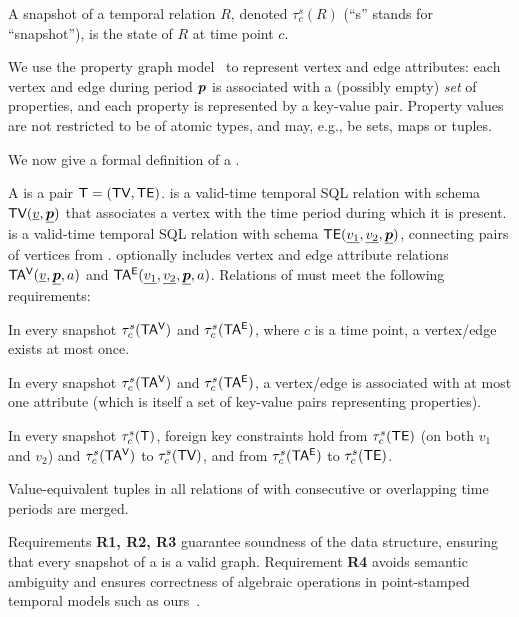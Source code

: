 A snapshot of a temporal relation $R$, denoted $\tau^s_c(R)$ (``s''
stands for ``snapshot''), is the state of $R$ at time point $c$.

We use the property graph model~\cite{GraphDB} to represent vertex and
edge attributes: each vertex and edge during period $\boldsymbol{p}$ is
associated with a (possibly empty) {\em set} of properties, and each
property is represented by a key-value pair.  Property values are not
restricted to be of atomic types, and may, e.g., be sets, maps or
tuples.

We now give a formal definition of a \tg.

\begin{definition}[TGraph]
A \tg is a pair $\mathsf{T}=(\textsf{TV}, \textsf{TE})$. \tv is a valid-time temporal SQL
relation with schema $\textsf{TV}(\underline{v}, \underline{\boldsymbol{p}})$ that
associates a vertex with the time period during which it is
present. \te is a valid-time temporal SQL relation with schema
$\textsf{TE}(\underline{v_1}, \underline{v_2}, \underline{\boldsymbol{p}})$, connecting
pairs of vertices from \tv.  
%
\tve optionally includes vertex and edge attribute relations
$\mathsf{TA^{V}}(\underline{v}, \underline{\boldsymbol{p}}, a)$ and $\mathsf{TA^{E}}(\underline{v_1},
\underline{v_2}, \underline{\boldsymbol{p}}, a)$.  
%
Relations of \tve must meet the following requirements:

\begin{description}[noitemsep]
\item [R1: Unique vertices/ edges] In every snapshot $\tau^s_c
  (\mathsf{TA^{V}})$ and $\tau^s_c (\mathsf{TA^{E}})$, where $c$ is a time point, a
  vertex/edge exists at most once.
\item [R2: Unique attribute values] In every snapshot $\tau^s_c
  (\mathsf{TA^{V}})$ and $\tau^s_c (\mathsf{TA^{E}})$, a vertex/edge is associated with at
  most one attribute (which is itself a set of key-value pairs
  representing properties).
\item [R3: Referential integrity] In every snapshot $\tau^s_c (\mathsf{T})$,
  foreign key constraints hold from $\tau^s_c (\textsf{TE})$ (on both $v_1$
  and $v_2$) and $\tau^s_c (\mathsf{TA^{V}})$ to $\tau^s_c (\textsf{TV})$, and from
  $\tau^s_c (\mathsf{TA^{E}})$ to $\tau^s_c (\textsf{TE})$.
\item [R4: Coalesced] Value-equivalent tuples in all relations of \tve
  with consecutive or overlapping time periods are merged.  
\end{description}
\label{def:tg}
\vspace{-0.5cm}
\end{definition}

Requirements {\bf R1, R2, R3} guarantee soundness of the \tg data
structure, ensuring that every snapshot of a \tg is a valid graph.
Requirement {\bf R4} avoids semantic ambiguity and ensures correctness
of algebraic operations in point-stamped temporal models such as
ours~\cite{DBLP:reference/db/JensenS09k}.

